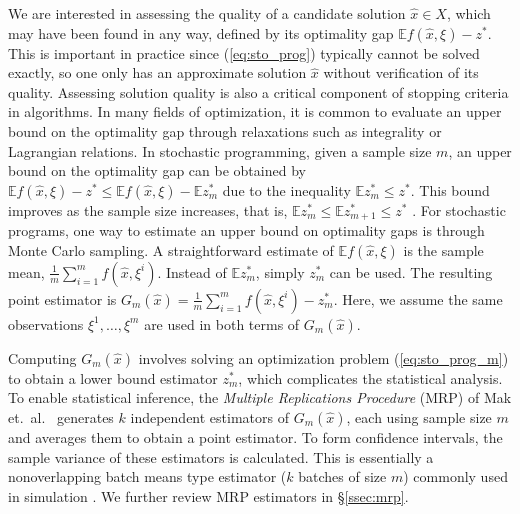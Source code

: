 \documentclass[11pt]{article}
\newcommand{\e}[1]{\mathbb{E} %
#1 %
}
\newcommand{\x}{x} %
\newcommand{\xh}{{\hat{\x}}}
\newcommand{\xit}{\xi}  %
\newcommand{\xiti}{\xit^i}
\newcommand{\zs}{z^*}
\begin{document}
We are interested in assessing the quality of a candidate solution $\xh \in X$, which may have been found in any way, defined by its optimality gap $\e{f(\xh,\xit)} - \zs$.  
This is important in practice since (\ref{eq:sto_prog}) typically cannot be solved exactly, so one only has an approximate solution $\xh$ without verification of its quality.  
Assessing solution quality is also a critical component of stopping criteria in algorithms.  
In many fields of optimization, it is common to evaluate an upper bound on the optimality gap through relaxations such as integrality or Lagrangian relations.  
In stochastic programming, given a sample size $m$, an upper bound on the optimality gap can be obtained by $\e{f(\xh,\xit)} - \zs \leq \e{f(\xh,\xit)} - \e{\zs_m}$ due to the inequality $\e{\zs_m} \leq \zs$.  
This bound improves as the sample size increases, that is, $\e{\zs_m} \leq \e{\zs_{m+1}} \leq \zs$ \cite{Mak1999,norkin_pflug_ruszczynski_98}.  
For stochastic programs, one way to estimate an upper bound on optimality gaps is through Monte Carlo sampling. 
A straightforward estimate of $\e{f(\xh,\xit)}$ is the sample mean, $\frac{1}{m} \sum_{i=1}^m f(\xh,\xiti)$. 
Instead of $\e{\zs_m}$, simply $\zs_m$ can be used.  
The resulting point estimator is  $G_m(\xh) = \frac{1}{m} \sum_{i=1}^m f(\xh,\xiti) - \zs_m$.  
Here, we assume the same observations $\xit^1, \dots, \xit^m$ are used in both terms of $G_m(\xh)$.  

Computing $G_m(\xh)$ involves solving an optimization problem (\ref{eq:sto_prog_m}) to obtain a lower bound estimator $\zs_m$, which complicates the statistical analysis. 
To enable statistical inference, the \emph{Multiple Replications Procedure} (MRP) of Mak et.\ al.\ \cite{Mak1999} generates $k$ independent estimators of $G_m(\xh)$, each using sample size $m$ and averages them to obtain a point estimator.  
To form confidence intervals, the sample variance of these estimators is calculated.  
This is essentially a nonoverlapping batch means type estimator ($k$ batches of size $m$) commonly used in simulation \cite{law_07}. 
We further review MRP estimators in \S \ref{ssec:mrp}.
\end{document}
